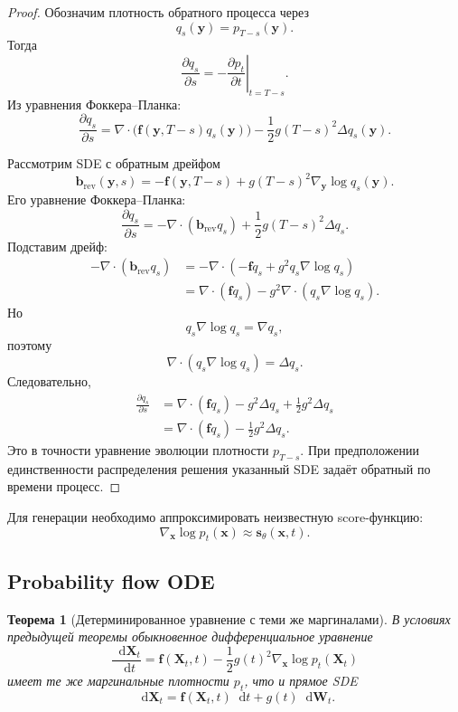 \documentclass[12pt,a4paper]{article}
\newtheorem{theorem}{Теорема}[section]
\theoremstyle{definition}
\newcommand{\dd}{\mathop{}\!\mathrm{d}}
\newcommand{\1}{\mathbf{1}}
\begin{document}
\begin{proof}
Обозначим плотность обратного процесса через
\[
    q_s(\bm{y})=p_{T-s}(\bm{y}).
\]
Тогда
\[
    \frac{\partial q_s}{\partial s}
    =
    -
    \left.
    \frac{\partial p_t}{\partial t}
    \right|_{t=T-s}.
\]
Из уравнения Фоккера--Планка:
\[
    \frac{\partial q_s}{\partial s}
    =
    \nabla\cdot
    \bigl(
        \bm{f}(\bm{y},T-s)q_s(\bm{y})
    \bigr)
    -
    \frac{1}{2}g(T-s)^2\Delta q_s(\bm{y}).
\]

Рассмотрим SDE с обратным дрейфом
\[
    \bm{b}_{\mathrm{rev}}(\bm{y},s)
    =
    -\bm{f}(\bm{y},T-s)
    +
    g(T-s)^2\nabla_{\bm{y}}\log q_s(\bm{y}).
\]
Его уравнение Фоккера--Планка:
\[
    \frac{\partial q_s}{\partial s}
    =
    -
    \nabla\cdot(\bm{b}_{\mathrm{rev}}q_s)
    +
    \frac{1}{2}g(T-s)^2\Delta q_s.
\]
Подставим дрейф:
\begin{align*}
    -
    \nabla\cdot(\bm{b}_{\mathrm{rev}}q_s)
    &=
    -
    \nabla\cdot
    \left(
        -\bm{f}q_s
        +
        g^2q_s\nabla\log q_s
    \right)\\
    &=
    \nabla\cdot(\bm{f}q_s)
    -
    g^2\nabla\cdot(q_s\nabla\log q_s).
\end{align*}
Но
\[
    q_s\nabla\log q_s=\nabla q_s,
\]
поэтому
\[
    \nabla\cdot(q_s\nabla\log q_s)=\Delta q_s.
\]
Следовательно,
\begin{align*}
    \frac{\partial q_s}{\partial s}
    &=
    \nabla\cdot(\bm{f}q_s)
    -
    g^2\Delta q_s
    +
    \frac{1}{2}g^2\Delta q_s\\
    &=
    \nabla\cdot(\bm{f}q_s)
    -
    \frac{1}{2}g^2\Delta q_s.
\end{align*}
Это в точности уравнение эволюции плотности
$p_{T-s}$. При предположении единственности распределения решения
указанный SDE задаёт обратный по времени процесс.
\end{proof}

Для генерации необходимо аппроксимировать неизвестную score-функцию:
\[
    \nabla_{\bm{x}}\log p_t(\bm{x})
    \approx
    \bm{s}_\theta(\bm{x},t).
\]

\subsection{Probability flow ODE}

\begin{theorem}[Детерминированное уравнение с теми же маргиналами]
В условиях предыдущей теоремы обыкновенное дифференциальное уравнение
\[
    \frac{\dd\bm{X}_t}{\dd t}
    =
    \bm{f}(\bm{X}_t,t)
    -
    \frac{1}{2}g(t)^2
    \nabla_{\bm{x}}\log p_t(\bm{X}_t)
\]
имеет те же маргинальные плотности $p_t$, что и прямое SDE
\[
    \dd\bm{X}_t
    =
    \bm{f}(\bm{X}_t,t)\dd t
    +
    g(t)\dd\bm{W}_t.
\]
\end{theorem}
\end{document}
